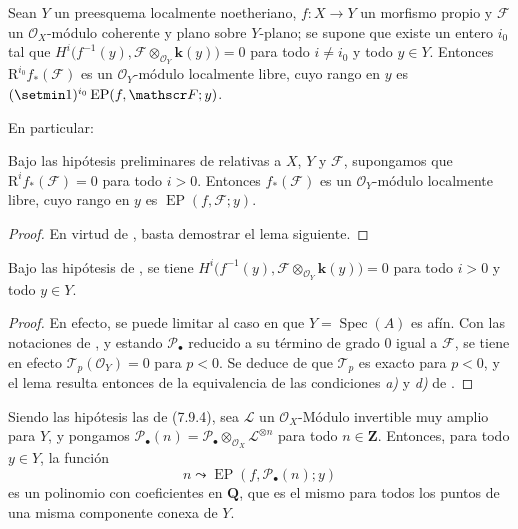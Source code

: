 \begin{corollary}[7.9.9]
\label{III.7.9.9}
\label{III.7.9.9.fr}
Sean $Y$ un preesquema localmente noetheriano,
$f:X\to Y$ un morfismo propio y $\mathscr F$ un
$\mathscr O_X$-módulo coherente y plano sobre $Y$-plano; se supone que existe un entero $i_0$ tal que
$H^i\bigl(f^{-1}(y),\mathscr F\otimes_{\mathscr O_Y}\boldsymbol{k}(y)\bigr)=0$
para todo $i\ne i_0$ y todo $y\in Y$. Entonces
$\mathrm R^{i_0}f_*(\mathscr F)$ es un $\mathscr O_Y$-módulo localmente
libre, cuyo rango en $y$ es
$(\setmin 1)^{i_0}\operatorname{EP}(f,\mathscr F;y)$.
\end{corollary}

En particular:

\begin{corollary}[7.9.10]
\label{III.7.9.10}
\label{III.7.9.10.fr}
Bajo las hipótesis preliminares de \textup{} relativas a
$X$, $Y$ y $\mathscr F$, supongamos que
$\mathrm R^if_*(\mathscr F)=0$ para todo $i>0$. Entonces
$f_*(\mathscr F)$ es un $\mathscr O_Y$-módulo localmente libre,
cuyo rango en $y$ es $\operatorname{EP}(f,\mathscr F;y)$.
\end{corollary}

\begin{proof}
En virtud de , basta demostrar el lema siguiente.
\end{proof}

\begin{lemma}[7.9.10.1]
\label{III.7.9.10.1}
\label{III.7.9.10.1.fr}
Bajo las hipótesis de \textup{}, se tiene
$H^i\bigl(f^{-1}(y),\mathscr F\otimes_{\mathscr O_Y}\boldsymbol{k}(y)\bigr)=0$
para todo $i>0$ y todo $y\in Y$.
\end{lemma}

\begin{proof}
En efecto, se puede limitar al caso en que $Y=\operatorname{Spec}(A)$ es afín.
Con las notaciones de , y estando
$\mathscr P_\bullet$ reducido a su término
de grado $0$ igual a $\mathscr F$, se tiene en efecto
$\mathscr T_p(\mathscr O_Y)=0$ para $p<0$. Se deduce de
 que $\mathscr T_p$ es exacto para $p<0$, y el
lema resulta entonces de la equivalencia de las condiciones \emph{a)} y
\emph{d)} de .
\end{proof}

\begin{proposition}[7.9.11]
\label{III.7.9.11.fr}
Siendo las hipótesis las de \textup{(7.9.4)}, sea $\mathscr L$ un
$\mathscr O_X$-Módulo invertible muy amplio para $Y$, y pongamos
$\mathscr P_\bullet(n)=\mathscr P_\bullet\otimes_{\mathscr O_X}
\mathscr L^{\otimes n}$ para todo $n\in\mathbf Z$. Entonces, para todo $y\in Y$,
la función
\[
  n\leadsto\operatorname{EP}(f,\mathscr P_\bullet(n);y)
  \tag{7.9.11.1}\label{III.7.9.11.1.fr}
\]
es un polinomio con coeficientes en $\mathbf Q$, que es el mismo para todos los
puntos de una misma componente conexa de $Y$.
\end{proposition}


